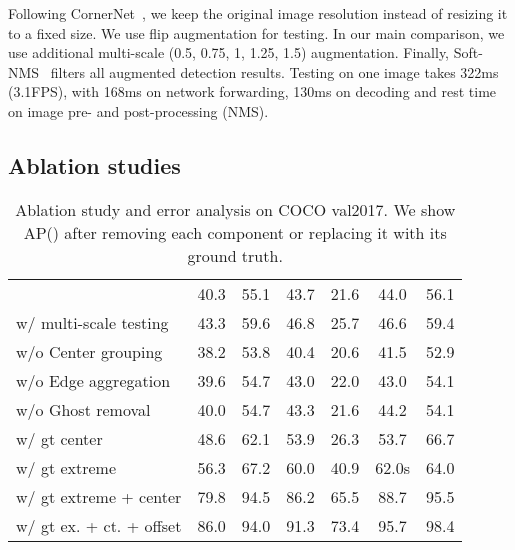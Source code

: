\documentclass[10pt,twocolumn,letterpaper]{article}
\begin{document}
Following CornerNet~\cite{Law_2018_ECCV}, we keep the original image resolution instead of resizing it to a fixed size.  
We use flip augmentation for testing.
In our main comparison, we use additional  multi-scale (0.5, 0.75, 1, 1.25, 1.5) augmentation. 
Finally, Soft-NMS~\cite{bodla2017soft} filters all augmented detection results. 
Testing on one image takes 322ms (3.1FPS), with 168ms on network forwarding, 130ms on decoding and rest time on image pre- and post-processing (NMS). 

\subsection{Ablation studies}

\setlength{\tabcolsep}{2pt}
\begin{table}
\begin{center}
\begin{tabular}{lcccccc}
\toprule
 &   &  &  &  &  &  \\
\midrule
 & 40.3 & 55.1 & 43.7 & 21.6 & 44.0 & 56.1\\
w/ multi-scale testing & 43.3 & 59.6 & 46.8 & 25.7 & 46.6 & 59.4\\
\midrule
w/o Center grouping & 38.2 & 53.8 & 40.4 & 20.6 & 41.5 & 52.9 \\
w/o Edge aggregation & 39.6 & 54.7 & 43.0 & 22.0 & 43.0 & 54.1 \\
w/o Ghost removal & 40.0 & 54.7 & 43.3 & 21.6 & 44.2 & 54.1\\
\midrule
w/ gt center & 48.6 & 62.1 & 53.9 & 26.3 & 53.7 & 66.7 \\
w/ gt extreme & 56.3 & 67.2 & 60.0 & 40.9 & 62.0s & 64.0\\
w/ gt extreme + center & 79.8 & 94.5 & 86.2 & 65.5 & 88.7 & 95.5\\
w/ gt ex. + ct. + offset & 86.0 & 94.0 & 91.3 & 73.4 & 95.7 & 98.4\\
\bottomrule
\end{tabular}
\caption{Ablation study and error analysis on COCO val2017. We show AP() after removing each component or replacing it with its ground truth.}
\label{table:Ablation}
\label{table:Error}
\end{center}
\end{table}
\setlength{\tabcolsep}{1.4pt}
\end{document}
